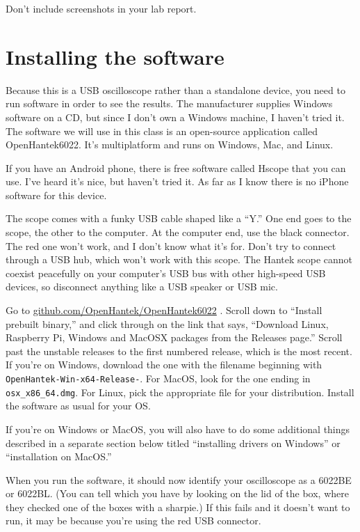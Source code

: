Don't include screenshots in your lab report.

\section*{Installing the software}

Because this is a USB oscilloscope rather than a standalone device,
you need to run software in order to see the results. The manufacturer
supplies Windows software on a CD, but since I don't own a Windows machine,
I haven't tried it. The software we will use in this class is an open-source application
called OpenHantek6022.
It's multiplatform and runs on Windows, Mac, and Linux.

If you have an Android phone, there is
free software called Hscope that you can use. I've heard it's nice, but haven't tried it.
As far as I know there is no iPhone software for this device.

The scope comes with a funky USB cable shaped like a ``Y.'' One end goes to the
scope, the other to the computer. At the computer end, use the black connector. The red
one won't work, and I don't know what it's for.
Don't try to connect through a USB hub, which won't work with this scope.
The Hantek scope cannot coexist peacefully on your computer's USB bus with other
high-speed USB devices, so disconnect anything like a USB speaker or USB mic.

Go to \url{github.com/OpenHantek/OpenHantek6022} . Scroll down to ``Install prebuilt binary,''
and click through on the link that says, ``Download Linux, Raspberry Pi, Windows and MacOSX packages from the Releases page.''
Scroll past the unstable releases to the first numbered release, which is the most recent.
If you're on Windows, download the one with the filename beginning with {\tt OpenHantek-Win-x64-Release-}.
For MacOS, look for the one ending in {\tt osx\_x86\_64.dmg}. For Linux, pick the appropriate file
for your distribution.
Install the software as usual for your OS.

If you're on Windows or MacOS, you will also have to do some additional things
described in a separate section below titled ``installing drivers on Windows''
or ``installation on MacOS.''


When you run the software, it should now identify your oscilloscope as a 6022BE or
6022BL. (You can tell which you have by looking on the lid of the box, where they
checked one of the boxes with a sharpie.) If this fails and it doesn't want to run,
it may be because you're using the red USB connector.

